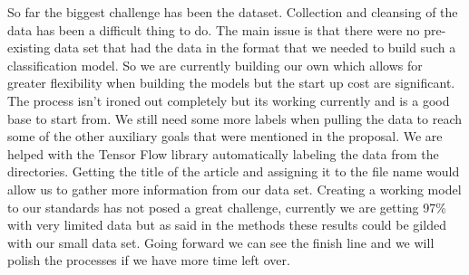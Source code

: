 So far the biggest challenge has been the dataset. 
Collection and cleansing of the data has been a difficult thing to do. 
The main issue is that there were no pre-existing data set that had the data in the format that we needed to build such a classification model. 
So we are currently building our own which allows for greater flexibility when building the models but the start up cost are significant. 
The process isn't ironed out completely but its working currently and is a good base to start from. 
We still need some more labels when pulling the data to reach some of the other auxiliary goals that were mentioned in the proposal. 
We are helped with the Tensor Flow library automatically labeling the data from the directories. 
Getting the title of the article and assigning it to the file name would allow us to gather more information from our data set.
Creating a working model to our standards has not posed a great challenge, currently we are getting 97\% with very limited data but as said in the methods these results could be gilded with our small data set.  
Going forward we can see the finish line and we will polish the processes if we have more time left over. 

